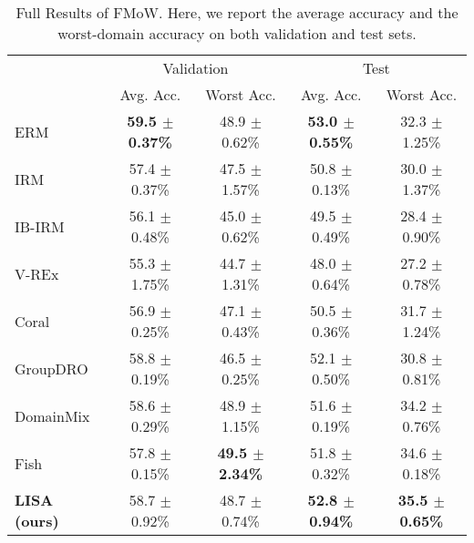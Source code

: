 \begin{table*}[h]
\small
\caption{Full Results of FMoW. Here, we report the average accuracy and the worst-domain accuracy on both validation and test sets.}
\label{tab:fmow_full}
\begin{center}
\begin{tabular}{l|cc|cc}
\toprule
\multirow{2}{*}{}  & \multicolumn{2}{c}{Validation} & \multicolumn{2}{c}{Test}\\
& Avg. Acc. & Worst Acc. & Avg. Acc. & Worst Acc. \\\midrule
ERM &  \textbf{59.5 $\pm$ 0.37\%} & 48.9 $\pm$ 0.62\% & \textbf{53.0 $\pm$ 0.55\%} & 32.3 $\pm$ 1.25\% \\
IRM  & 57.4 $\pm$ 0.37\% & 47.5 $\pm$ 1.57\% & 50.8 $\pm$ 0.13\% & 30.0 $\pm$ 1.37\% \\
IB-IRM & 56.1 $\pm$ 0.48\% & 45.0 $\pm$ 0.62\% & 49.5 $\pm$ 0.49\% & 28.4 $\pm$ 0.90\% \\
V-REx  & 55.3 $\pm$ 1.75\% & 44.7 $\pm$ 1.31\% & 48.0 $\pm$ 0.64\% & 27.2 $\pm$ 0.78\%\\
Coral & 56.9 $\pm$ 0.25\% & 47.1 $\pm$ 0.43\% & 50.5 $\pm$ 0.36\% & 31.7 $\pm$ 1.24\% \\
GroupDRO & 58.8 $\pm$ 0.19\% & 46.5 $\pm$ 0.25\% & 52.1 $\pm$ 0.50\% & 30.8 $\pm$ 0.81\% \\
DomainMix & 58.6 $\pm$ 0.29\% & 48.9 $\pm$ 1.15\% & 51.6 $\pm$ 0.19\% & 34.2 $\pm$ 0.76\% \\
Fish & 57.8 $\pm$ 0.15\% & \textbf{49.5 $\pm$ 2.34\%} & 51.8 $\pm$ 0.32\% & 34.6 $\pm$ 0.18\% \\
\midrule
\textbf{LISA (ours)} & 58.7 $\pm$ 0.92\% & 48.7 $\pm$ 0.74\% & \textbf{52.8 $\pm$ 0.94\%} & \textbf{35.5 $\pm$ 0.65\%} \\
\bottomrule
\end{tabular}
\end{center}
\end{table*}


